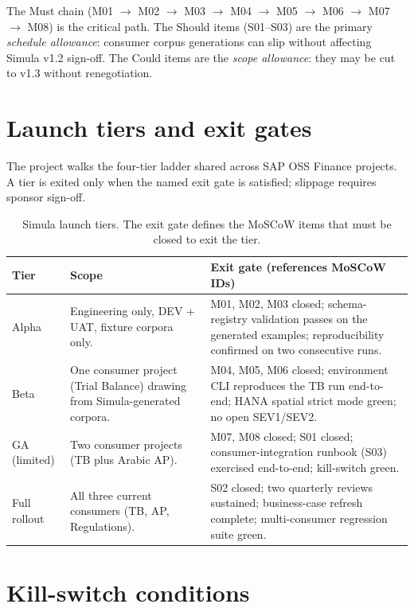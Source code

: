 \noindent
The Must chain (M01 $\to$ M02 $\to$ M03 $\to$ M04 $\to$ M05 $\to$ M06
$\to$ M07 $\to$ M08) is the critical path. The Should items
(S01--S03) are the primary \emph{schedule allowance}: consumer corpus
generations can slip without affecting Simula v1.2 sign-off. The Could
items are the \emph{scope allowance}: they may be cut to v1.3 without
renegotiation.

\section{Launch tiers and exit gates}\label{sec:sim-launch-tiers}

The project walks the four-tier ladder shared across SAP OSS Finance
projects. A tier is exited only when the named exit gate is satisfied;
slippage requires sponsor sign-off.

\begin{table}[htbp]
\centering
\caption{Simula launch tiers. The exit gate defines the MoSCoW items
that must be closed to exit the tier.}
\label{tab:sim-launch-tiers}
\footnotesize
\begin{tabularx}{\linewidth}{@{}l l X@{}}
\toprule
\textbf{Tier} & \textbf{Scope} & \textbf{Exit gate (references MoSCoW IDs)} \\ \midrule
Alpha & Engineering only, DEV + UAT, fixture corpora only. & M01, M02, M03 closed; schema-registry validation passes on the generated examples; reproducibility confirmed on two consecutive runs. \\
Beta  & One consumer project (Trial Balance) drawing from Simula-generated corpora. & M04, M05, M06 closed; environment CLI reproduces the TB run end-to-end; HANA spatial strict mode green; no open SEV1/SEV2. \\
GA (limited) & Two consumer projects (TB plus Arabic AP). & M07, M08 closed; S01 closed; consumer-integration runbook (S03) exercised end-to-end; kill-switch green. \\
Full rollout & All three current consumers (TB, AP, Regulations). & S02 closed; two quarterly reviews sustained; business-case refresh complete; multi-consumer regression suite green. \\
\bottomrule
\end{tabularx}
\end{table}

\section{Kill-switch conditions}\label{sec:sim-kill-switch}

